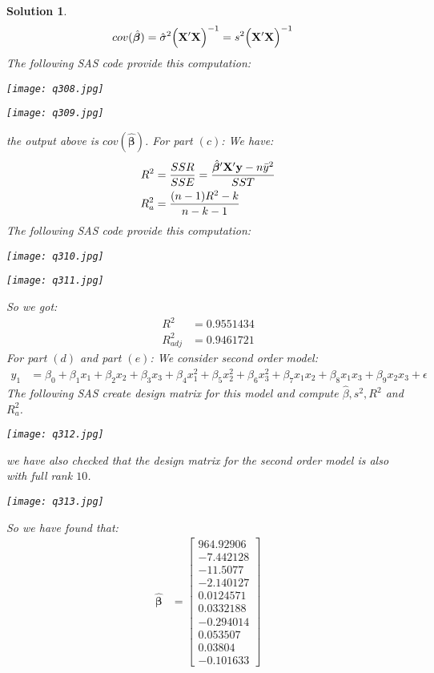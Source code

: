 \documentclass[11pt]{article}
\newtheorem{sol}{Solution}
\begin{document}
\begin{sol}
\begin{align*}
		cov(\hat{{\bm \beta}}) &= \hat{\sigma}^2\Big({\bf X}'{\bf X}\Big)^{-1} = s^2\Big({\bf X}'{\bf X}\Big)^{-1}
	\end{align*}
	The following SAS code provide this computation:
	\begin{center}
		\texttt{[image: q308.jpg]}
	\end{center}
	\begin{center}
		\texttt{[image: q309.jpg]}
	\end{center}
	the output above is $cov(\hat{{\bm \beta}})$.\vskip 2mm
	For part $(c)$:\vskip 2mm
	We have:
	\begin{align*}
		R^2 &=\frac{SSR}{SSE} =  \frac{\hat{{\bm \beta}}'{\bf X}'{\bf y} - n\bar{y}^2}{SST}\\
		R^2_a &= \frac{(n - 1)R^2 - k}{n - k  - 1}
	\end{align*}
	The following SAS code provide this computation:
	\begin{center}
		\texttt{[image: q310.jpg]}
	\end{center}
	\begin{center}
		\texttt{[image: q311.jpg]}
	\end{center}
	So we got:
	\begin{align*}
		R^2 &= 0.9551434\\
		R^2_{adj} &= 0.9461721
	\end{align*}
	For part $(d)$ and part $(e)$:\vskip 2mm
	We consider second order model:
	\begin{align*}
		y_1 &= \beta_0 + \beta_1 x_1 + \beta_2x_2 + \beta_3x_3 + \beta_4x_1^2 + \beta_5x_2^2
		+ \beta_6x_3^2+ \beta_7x_1x_2 + \beta_8x_1x_3 + \beta_9x_2x_3 + \epsilon
	\end{align*}
	The following SAS create design matrix for this model and compute $\hat{\beta}, s^2, R^2$ and $R^2_a$.
	\begin{center}
		\texttt{[image: q312.jpg]}
	\end{center}
	we have also checked that the design matrix for the second order model is also with full rank $10$.
	\begin{center}
		\texttt{[image: q313.jpg]}
	\end{center}
	So we have found that:
	\begin{align*}
		\hat{{\bm \beta}} &= \left[\begin{array}{c}964.92906 \\ -7.442128\\ -11.5077\\ -2.140127\\0.0124571 \\ 0.0332188\\ -0.294014\\ 0.053507\\ 0.03804\\ -0.101633\end{array}\right]

\end{align*}
\end{sol}
\end{document}
